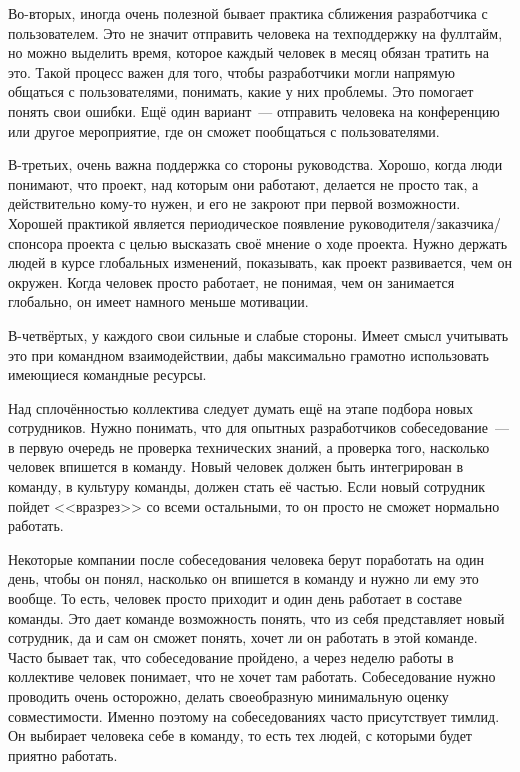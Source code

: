 \documentclass{../../text-style}
\begin{document}
Во-вторых, иногда очень полезной бывает практика сближения разработчика с пользователем. Это не значит отправить человека на техподдержку на фуллтайм, но можно выделить время, которое каждый человек в месяц обязан тратить на это. Такой процесс важен для того, чтобы разработчики могли напрямую общаться с пользователями, понимать, какие у них проблемы. Это помогает понять свои ошибки. Ещё один вариант~--- отправить человека на конференцию или другое мероприятие, где он сможет пообщаться с пользователями.

В-третьих, очень важна поддержка со стороны руководства. Хорошо, когда люди понимают, что проект, над которым они работают, делается не просто так, а действительно кому-то нужен, и его не закроют при первой возможности. Хорошей практикой является периодическое появление руководителя/заказчика/спонсора проекта с целью высказать своё мнение о ходе проекта. Нужно держать людей в курсе глобальных изменений, показывать, как проект развивается, чем он окружен. Когда человек просто работает, не понимая, чем он занимается глобально, он имеет намного меньше мотивации.

В-четвёртых, у каждого свои сильные и слабые стороны. Имеет смысл учитывать это при командном взаимодействии, дабы максимально грамотно использовать имеющиеся командные ресурсы.

Над сплочённостью коллектива следует думать ещё на этапе подбора новых сотрудников. Нужно понимать, что для опытных разработчиков собеседование~--- в первую очередь не проверка технических знаний, а проверка того, насколько человек впишется в команду. Новый человек должен быть интегрирован в команду, в культуру команды, должен стать её частью. Если новый сотрудник пойдет <<вразрез>> со всеми остальными, то он просто не сможет нормально работать.

Некоторые компании после собеседования человека берут поработать на один день, чтобы он понял, насколько он впишется в команду и нужно ли ему это вообще. То есть, человек просто приходит и один день работает в составе команды. Это дает команде возможность понять, что из себя представляет новый сотрудник, да и сам он сможет понять, хочет ли он работать в этой команде. Часто бывает так, что собеседование пройдено, а через неделю работы в коллективе человек понимает, что не хочет там работать. Собеседование нужно проводить очень осторожно, делать своеобразную минимальную оценку совместимости. Именно поэтому на собеседованиях часто присутствует тимлид. Он выбирает человека себе в команду, то есть тех людей, с которыми будет приятно работать.
\end{document}
